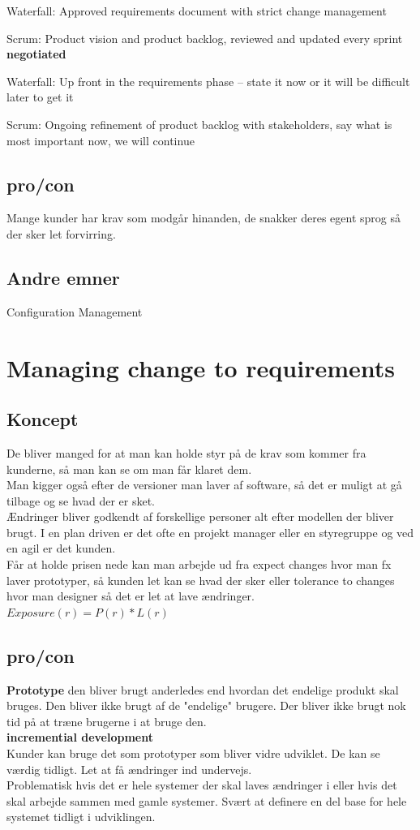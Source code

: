 \documentclass[11pt,a4paper]{article}
\begin{document}
Waterfall: Approved requirements document with strict change management

Scrum: Product vision and product backlog, reviewed and updated every sprint\\
\textbf{negotiated}

Waterfall: Up front in the requirements phase – state it now or it will be difficult later to get it

Scrum: Ongoing refinement of product backlog with stakeholders, say what is most important now, we will continue
\subsection{pro/con}
Mange kunder har krav som modgår hinanden, de snakker deres egent sprog så der sker let forvirring.
\subsection{Andre emner}
Configuration Management
\newpage
\section{Managing change to requirements}
\subsection{Koncept}
De bliver manged for at man kan holde styr på de krav som kommer fra kunderne, så man kan se om man får klaret dem.\\
Man kigger også efter de versioner man laver af software, så det er muligt at gå tilbage og se hvad der er sket.\\
Ændringer bliver godkendt af forskellige personer alt efter modellen der bliver brugt. I en plan driven er det ofte en projekt manager eller en styregruppe og ved en agil er det kunden.\\
Får at holde prisen nede kan man arbejde ud fra expect changes hvor man fx laver prototyper, så kunden let kan se hvad der sker eller tolerance to changes hvor man designer så det er let at lave ændringer.\\
$Exposure(r)= P(r) * L(r)$
\subsection{pro/con}
\textbf{Prototype} den bliver brugt anderledes end hvordan det endelige produkt skal bruges. Den bliver ikke brugt af de "endelige" brugere. Der bliver ikke brugt nok tid på at træne brugerne i at bruge den.\\
\textbf{incremential development}\\
Kunder kan bruge det som prototyper som bliver vidre udviklet. De kan se værdig tidligt. Let at få ændringer ind undervejs.\\
Problematisk hvis det er hele systemer der skal laves ændringer i eller hvis det skal arbejde sammen med gamle systemer. Svært at definere en del base for hele systemet tidligt i udviklingen. 
\end{document}
